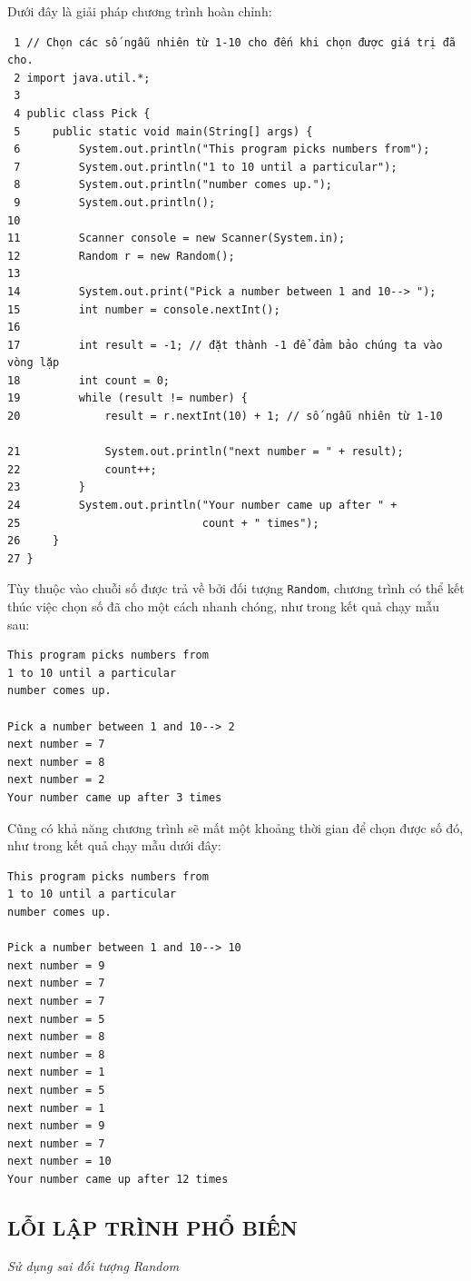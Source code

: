 Dưới đây là giải pháp chương trình hoàn chỉnh:
\begin{verbatim}
 1 // Chọn các số ngẫu nhiên từ 1-10 cho đến khi chọn được giá trị đã cho.
 2 import java.util.*;
 3 
 4 public class Pick {
 5     public static void main(String[] args) {
 6         System.out.println("This program picks numbers from");
 7         System.out.println("1 to 10 until a particular");
 8         System.out.println("number comes up.");
 9         System.out.println();
10
11         Scanner console = new Scanner(System.in);
12         Random r = new Random();
13
14         System.out.print("Pick a number between 1 and 10--> ");
15         int number = console.nextInt();
16
17         int result = -1; // đặt thành -1 để đảm bảo chúng ta vào vòng lặp
18         int count = 0;
19         while (result != number) {
20             result = r.nextInt(10) + 1; // số ngẫu nhiên từ 1-10

21             System.out.println("next number = " + result);
22             count++;
23         }
24         System.out.println("Your number came up after " +
25                            count + " times");
26     }
27 }
\end{verbatim}

Tùy thuộc vào chuỗi số được trả về bởi đối tượng \texttt{Random}, chương trình có thể kết thúc việc chọn số đã cho một cách nhanh chóng, như trong kết quả chạy mẫu sau:
\begin{verbatim}
This program picks numbers from 
1 to 10 until a particular 
number comes up. 
 
Pick a number between 1 and 10--> 2 
next number = 7 
next number = 8 
next number = 2 
Your number came up after 3 times
\end{verbatim}

Cũng có khả năng chương trình sẽ mất một khoảng thời gian để chọn được số đó, như trong kết quả chạy mẫu dưới đây:
\begin{verbatim}
This program picks numbers from 
1 to 10 until a particular 
number comes up. 
 
Pick a number between 1 and 10--> 10 
next number = 9 
next number = 7 
next number = 7 
next number = 5 
next number = 8 
next number = 8 
next number = 1 
next number = 5 
next number = 1 
next number = 9 
next number = 7 
next number = 10 
Your number came up after 12 times
\end{verbatim}

\subsection*{LỖI LẬP TRÌNH PHỔ BIẾN}
\textit{Sử dụng sai đối tượng Random}

